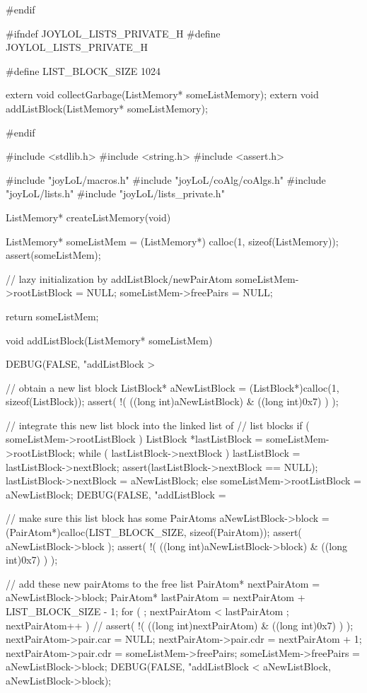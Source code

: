 #endif
\stopCHeader

\startCHeader
#ifndef JOYLOL_LISTS_PRIVATE_H
#define JOYLOL_LISTS_PRIVATE_H

#define LIST_BLOCK_SIZE 1024

extern void collectGarbage(ListMemory* someListMemory);
extern void addListBlock(ListMemory* someListMemory);

#endif
\stopCHeader

\startCCode
#include <stdlib.h>
#include <string.h>
#include <assert.h>

#include "joyLoL/macros.h"
#include "joyLoL/coAlg/coAlgs.h"
#include "joyLoL/lists.h"
#include "joyLoL/lists_private.h"

ListMemory* createListMemory(void) {
  ListMemory* someListMem = (ListMemory*) calloc(1, sizeof(ListMemory));
  assert(someListMem);

  // lazy initialization by addListBlock/newPairAtom
  someListMem->rootListBlock = NULL;
  someListMem->freePairs     = NULL;

  return someListMem;
}

void addListBlock(ListMemory* someListMem) {
  DEBUG(FALSE, "addListBlock > %

  // obtain a new list block
  ListBlock* aNewListBlock = (ListBlock*)calloc(1, sizeof(ListBlock));
  assert( !( ((long int)aNewListBlock) & ((long int)0x7) ) );

  // integrate this new list block into the linked list of
  // list blocks
  if ( someListMem->rootListBlock ) {
    ListBlock *lastListBlock = someListMem->rootListBlock;
    while ( lastListBlock->nextBlock ) {
      lastListBlock = lastListBlock->nextBlock;
    }
    assert(lastListBlock->nextBlock == NULL);
    lastListBlock->nextBlock = aNewListBlock;
  } else {
    someListMem->rootListBlock = aNewListBlock;
  }
  DEBUG(FALSE, "addListBlock = %

  // make sure this list block has some PairAtoms
  aNewListBlock->block = (PairAtom*)calloc(LIST_BLOCK_SIZE, sizeof(PairAtom));
  assert( aNewListBlock->block );
  assert( !( ((long int)aNewListBlock->block) & ((long int)0x7) ) );

  // add these new pairAtoms to the free list
  PairAtom* nextPairAtom = aNewListBlock->block;
  PairAtom* lastPairAtom = nextPairAtom + LIST_BLOCK_SIZE - 1;
  for ( ; nextPairAtom < lastPairAtom ; nextPairAtom++ ) {
//    assert( !( ((long int)nextPairAtom) & ((long int)0x7) ) );
    nextPairAtom->pair.car = NULL;
    nextPairAtom->pair.cdr = nextPairAtom + 1;
  }
  nextPairAtom->pair.cdr = someListMem->freePairs;
  someListMem->freePairs = aNewListBlock->block;
  DEBUG(FALSE, "addListBlock < %
        aNewListBlock, aNewListBlock->block);
}

